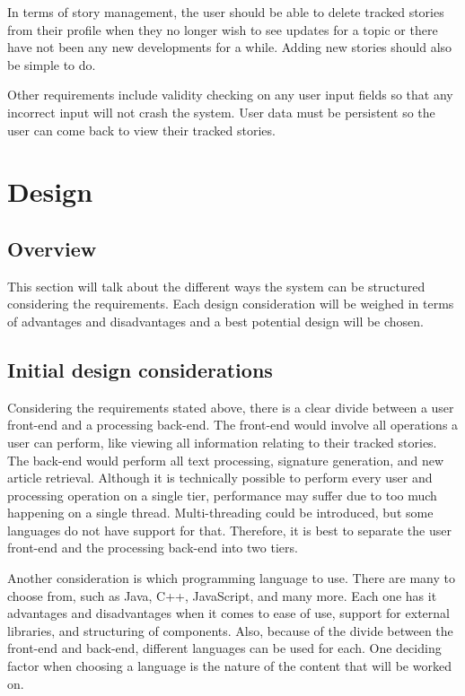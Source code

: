 \documentclass[11pt,titlepage]{report}
\begin{document}
In terms of story management, the user should be able to delete tracked stories from their profile when they no longer wish to see updates for a topic or there have not been any new developments for a while. Adding new stories should also be simple to do. 

Other requirements include validity checking on any user input fields so that any incorrect input will not crash the system. User data must be persistent so the user can come back to view their tracked stories. 

\section{Design}
\subsection{Overview}
This section will talk about the different ways the system can be structured considering the requirements. Each design consideration will be weighed in terms of advantages and disadvantages and a best potential design will be chosen.
\subsection{Initial design considerations}
Considering the requirements stated above, there is a clear divide between a user front-end and a processing back-end. The front-end would involve all operations a user can perform, like viewing all information relating to their tracked stories. The back-end would perform all text processing, signature generation, and new article retrieval. Although it is technically possible to perform every user and processing operation on a single tier, performance may suffer due to too much happening on a single thread. Multi-threading could be introduced, but some languages do not have support for that. Therefore, it is best to separate the user front-end and the processing back-end into two tiers. 

Another consideration is which programming language to use. There are many to choose from, such as Java, C++, JavaScript, and many more. Each one has it advantages and disadvantages when it comes to ease of use, support for external libraries, and structuring of components. Also, because of the divide between the front-end and back-end, different languages can be used for each. One deciding factor when choosing a language is the nature of the content that will be worked on. 
\end{document}
